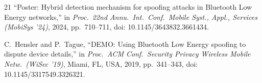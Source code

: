 \documentclass[journal,10pt]{IEEEtran}
\begin{document}
\begin{thebibliography}{21}
 ``Poster: Hybrid detection mechanism for spoofing
attacks in Bluetooth Low Energy networks,'' in \emph{Proc.\ 22nd Annu.\ Int.\
Conf.\ Mobile Syst., Appl., Services (MobiSys '24)}, 2024, pp.~710--711, doi:
10.1145/3643832.3661434.

 C.~Hensler and P.~Tague, ``DEMO: Using Bluetooth Low Energy
spoofing to dispute device details,'' in \emph{Proc.\ ACM Conf.\ Security
Privacy Wireless Mobile Netw.\ (WiSec '19)}, Miami, FL, USA, 2019, pp.~341--343,
doi: 10.1145/3317549.3326321.

\end{thebibliography}
\end{document}

